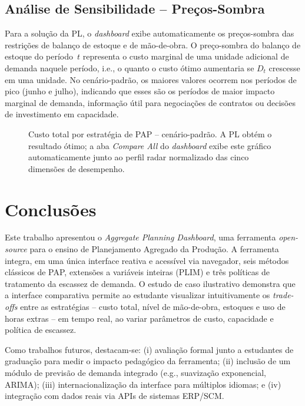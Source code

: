\documentclass[a4paper,11pt]{article}
\begin{document}
\subsection{Análise de Sensibilidade -- Preços-Sombra}

Para a solução da PL, o \textit{dashboard} exibe automaticamente os preços-sombra das
restrições de balanço de estoque e de mão-de-obra. O preço-sombra do balanço de estoque
do período~$t$ representa o custo marginal de uma unidade adicional de demanda naquele
período, i.e., o quanto o custo ótimo aumentaria se $D_t$ crescesse em uma unidade.
No cenário-padrão, os maiores valores ocorrem nos períodos de pico (junho e julho),
indicando que esses são os períodos de maior impacto marginal de demanda, informação
útil para negociações de contratos ou decisões de investimento em capacidade.

\begin{figure}[htbp]
  \centering
  \caption{Custo total por estratégia de PAP -- cenário-padrão. A PL obtém o resultado
  ótimo; a aba \textit{Compare All} do \textit{dashboard} exibe este gráfico
  automaticamente junto ao perfil radar normalizado das cinco dimensões de desempenho.}
  \label{fig:comparacao}
\end{figure}


\section{Conclusões}
\label{sec:conclusao}

Este trabalho apresentou o \textit{Aggregate Planning Dashboard}, uma ferramenta
\textit{open-source} para o ensino de Planejamento Agregado da Produção. A ferramenta
integra, em uma única interface reativa e acessível via navegador, seis métodos
clássicos de PAP, extensões a variáveis inteiras (PLIM) e três políticas de tratamento
da escassez de demanda. O estudo de caso ilustrativo demonstra que a interface comparativa
permite ao estudante visualizar intuitivamente os \textit{trade-offs} entre as estratégias
-- custo total, nível de mão-de-obra, estoques e uso de horas extras -- em tempo real,
ao variar parâmetros de custo, capacidade e política de escassez.

Como trabalhos futuros, destacam-se: (i) avaliação formal junto a estudantes de graduação
para medir o impacto pedagógico da ferramenta; (ii) inclusão de um módulo de previsão de
demanda integrado (e.g., suavização exponencial, ARIMA); (iii) internacionalização da
interface para múltiplos idiomas; e (iv) integração com dados reais via APIs de sistemas
ERP/SCM.

\bigskip


\end{document}
